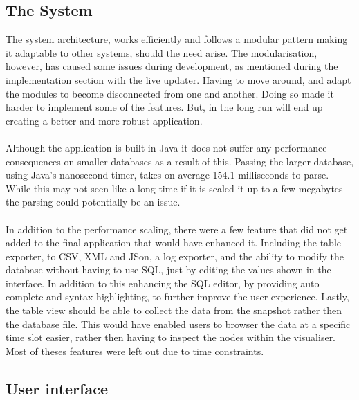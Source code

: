 \subsection{The System}
\label{subsec:system_eval}

The system architecture, works efficiently and follows a modular pattern making it adaptable to other systems, should the need arise. The modularisation, however, has caused some issues during development, as mentioned during the implementation section with the live updater. Having to move around, and adapt the modules to become disconnected from one and another. Doing so made it harder to implement some of the features. But, in the long run will end up creating a better and more robust application.
\\\\
Although the application is built in Java it does not suffer any performance consequences on smaller databases as a result of this. Passing the larger database, using Java's nanosecond timer, takes on average  154.1 milliseconds to parse. While this may not seen like a long time if it is scaled it up to a few megabytes the parsing could potentially be an issue. 
\\\\
In addition to the performance scaling, there were a few feature that did not get added to the final application that would have enhanced it. Including the table exporter, to CSV, XML and JSon, a log exporter, and the ability to modify the database without having to use SQL, just by editing the values shown in the interface. In addition to this enhancing the SQL editor, by providing  auto complete and syntax highlighting, to further improve the user experience. Lastly, the table view should be able to collect the data from the snapshot rather then the database file. This would have enabled users to browser the data at a specific time slot easier, rather then having to inspect the nodes within the visualiser.  Most of theses features were left out due to time constraints. 

\subsection{User interface}
\label{subsec:user_interface_eval}

